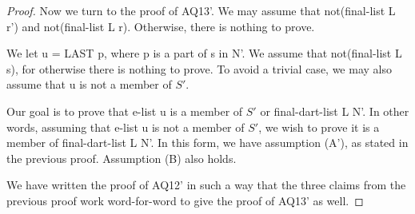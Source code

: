 \bigskip

\begin{proof} Now we turn to the proof of AQ13'.
We may assume that not(final-list L r') and not(final-list L r).  Otherwise,
there is nothing to prove.

We let u = LAST p, where p is a part of s in N'.  We assume that not(final-list L s),
for otherwise there is nothing to prove.  To avoid a trivial case,
we may also assume that u is not a member of $S'$.

Our goal is to prove that e-list u is a member
of $S'$  or final-dart-list L N'.  In other words, assuming that e-list u is not a member of $S'$,
we wish to prove it is a member of final-dart-list L N'.  In this form, we have assumption (A'), as
stated in the previous proof.  Assumption (B) also holds.

We have written the proof of AQ12' in such a way that the three claims from the previous proof
work word-for-word to give the proof of AQ13' as well.
\end{proof}
